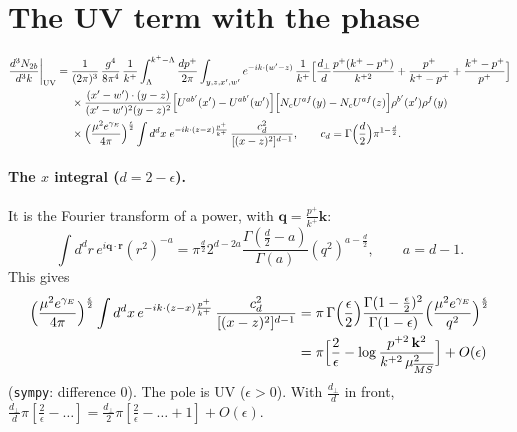 \documentclass[10pt]{article}
\numberwithin{equation}{section}
\newcommand{\phx}{e^{-ik\cdot(z-x)\frac{p^{+}}{k^{+}}}}
\begin{document}
\section{The UV term with the phase}
\begin{align}
\frac{d^{3}N_{2b}}{d^{3}k}\bigg|_{\rm UV}={}&\frac{1}{(2\pi)^{3}}\,\frac{g^{4}}{8\pi^{4}}\,\frac{1}{k^{+}}\int_{\Lambda}^{k^{+}-\Lambda}\frac{dp^{+}}{2\pi}\int_{y,z,x',w'}e^{-ik\cdot(w'-z)}\,\frac{1}{k^+}\Big[\frac{d_\perp}{d}\frac{p^{+}(k^{+}-p^{+})}{k^{+2}}+\frac{p^{+}}{k^{+}-p^{+}}+\frac{k^{+}-p^{+}}{p^{+}}\Big]\notag\\
&\times\frac{(x'-w')\cdot(y-z)}{(x'-w')^{2}(y-z)^{2}}\Big[U^{ab'}(x')-U^{ab'}(w')\Big]\Big[N_cU^{af}(y)-N_cU^{af}(z)\Big]\rho^{b'}(x')\rho^{f}(y)\notag\\
&\times\Big(\frac{\mu^2e^{\gamma_E}}{4\pi}\Big)^{\frac\epsilon2}\int d^dx\;\phx\,\frac{c_d^2}{[(x-z)^2]^{d-1}},\qquad c_d=\Gamma\Big(\frac d2\Big)\pi^{1-\frac d2}.
\label{eq:UVx}
\end{align}
\paragraph{The $x$ integral ($d=2-\epsilon$).} It is the Fourier transform of a power, with $\mathbf q=\frac{p^+}{k^+}\mathbf k$:
\begin{equation}
\int d^dr\,e^{i\mathbf q\cdot\mathbf r}(r^2)^{-a}=\pi^{\frac d2}2^{d-2a}\frac{\Gamma(\frac d2-a)}{\Gamma(a)}(q^2)^{a-\frac d2},\qquad a=d-1 .
\end{equation}
This gives
\begin{align}
\Big(\frac{\mu^2e^{\gamma_E}}{4\pi}\Big)^{\frac\epsilon2}\int d^dx\,\phx\,\frac{c_d^2}{[(x-z)^2]^{d-1}}&=\pi\,\Gamma\Big(\frac\epsilon2\Big)\frac{\Gamma(1-\frac\epsilon2)^2}{\Gamma(1-\epsilon)}\Big(\frac{\mu^2e^{\gamma_E}}{q^2}\Big)^{\frac\epsilon2}\notag\\
&=\pi\Big[\frac{2}{\epsilon}-\log\frac{p^{+2}\,\mathbf k^2}{k^{+2}\,\mu^2_{\overline{MS}}}\Big]+O(\epsilon)
\label{eq:J}
\end{align}
(\texttt{sympy}: difference $0$). The pole is UV ($\epsilon>0$). With $\frac{d_\perp}{d}$ in front, $\frac{d_\perp}{d}\pi[\frac2\epsilon-\dots]=\frac{d_\perp}{2}\pi[\frac2\epsilon-\dots+1]+O(\epsilon)$.
\end{document}
